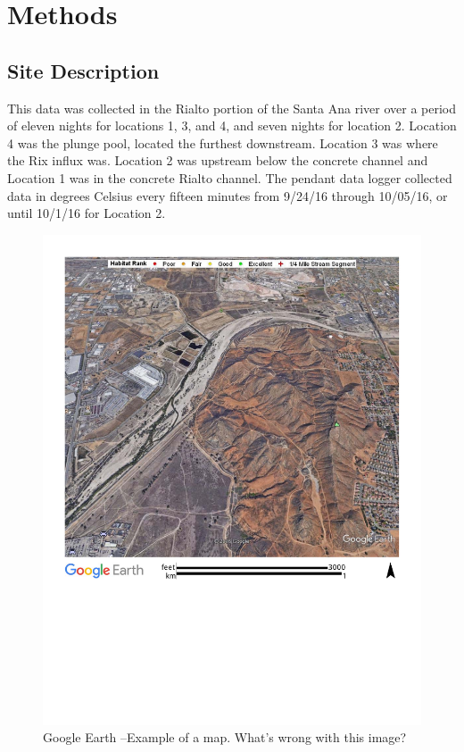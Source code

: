 \documentclass{article}
\begin{document}
\section{Methods}

\subsection{Site Description}

This data was collected in the Rialto portion of the Santa Ana river over a period of eleven nights for locations 1, 3, and 4, and seven nights for location 2. Location 4 was the plunge pool, located the furthest downstream. Location 3 was where the Rix influx was. Location 2 was upstream below the concrete channel and Location 1 was in the concrete Rialto channel. The pendant data logger collected data in degrees Celsius every fifteen minutes from 9/24/16 through 10/05/16, or until 10/1/16 for Location 2. 

\begin{figure}
\includegraphics[width=1.00\textwidth]{Figures/SantaAna_SatelliteImage}
\caption{Google Earth --Example of a map. What's wrong with this image?}
\label{SAR_Image}
\end{figure}
\end{document}
